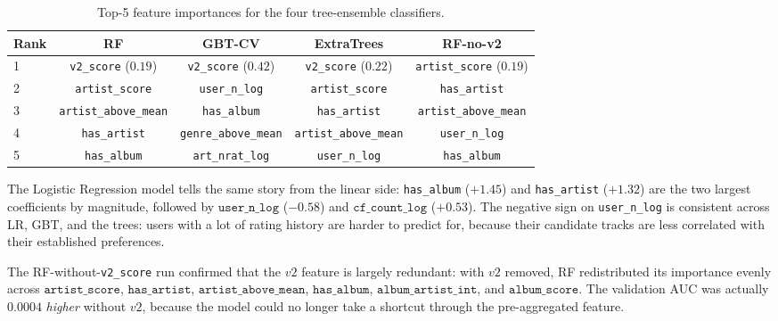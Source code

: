\documentclass[12pt]{article}
\begin{document}
	\begin{table}[H]
		\centering
		\caption{Top-5 feature importances for the four tree-ensemble classifiers.}\label{tab:fi}
		\begin{tabular}{lcccc}
			\toprule
			Rank & RF & GBT-CV & ExtraTrees & RF-no-v2 \\
			\midrule
			1 & \texttt{v2\_score} ($0.19$)          & \texttt{v2\_score} ($0.42$)         & \texttt{v2\_score} ($0.22$)        & \texttt{artist\_score} ($0.19$) \\
			2 & \texttt{artist\_score}                & \texttt{user\_n\_log}                & \texttt{artist\_score}              & \texttt{has\_artist} \\
			3 & \texttt{artist\_above\_mean}          & \texttt{has\_album}                  & \texttt{has\_artist}                & \texttt{artist\_above\_mean} \\
			4 & \texttt{has\_artist}                  & \texttt{genre\_above\_mean}          & \texttt{artist\_above\_mean}        & \texttt{user\_n\_log} \\
			5 & \texttt{has\_album}                   & \texttt{art\_nrat\_log}              & \texttt{user\_n\_log}               & \texttt{has\_album} \\
			\bottomrule
		\end{tabular}
	\end{table}

	The Logistic Regression model tells the same story from the linear side: \texttt{has\_album} ($+1.45$) and \texttt{has\_artist} ($+1.32$) are the two largest coefficients by magnitude, followed by $\texttt{user\_n\_log}$ ($-0.58$) and $\texttt{cf\_count\_log}$ ($+0.53$). The negative sign on \texttt{user\_n\_log} is consistent across LR, GBT, and the trees: users with a lot of rating history are harder to predict for, because their candidate tracks are less correlated with their established preferences.

	The RF-without-\texttt{v2\_score} run confirmed that the $v2$ feature is largely redundant: with $v2$ removed, RF redistributed its importance evenly across $\texttt{artist\_score}$, $\texttt{has\_artist}$, $\texttt{artist\_above\_mean}$, $\texttt{has\_album}$, $\texttt{album\_artist\_int}$, and $\texttt{album\_score}$. The validation AUC was actually $0.0004$ \emph{higher} without $v2$, because the model could no longer take a shortcut through the pre-aggregated feature.

	\newpage
\end{document}
